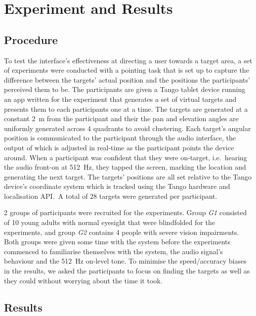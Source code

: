\documentclass{llncs}
\begin{document}
\section{Experiment and Results}\label{sec:experiment-and-results}

\subsection{Procedure}

To test the interface's effectiveness at directing a user towards a target area, a set of experiments were conducted with a pointing task that is set up to capture the difference between the targets' actual position and the positions the participants' perceived them to be.
The participants are given a Tango tablet device running an app written for the experiment that generates a set of virtual targets and presents them to each participants one at a time. 
The targets are generated at a constant \SI{2}{\meter} from the participant and their the pan and elevation angles are uniformly generated across 4 quadrants to avoid clustering.
Each target's angular position is communicated to the participant through the audio interface, the output of which is adjusted in real-time as the participant points the device around. 
When a participant was confident that they were on-target, i.e.\ hearing the audio front-on at \SI{512}{\hertz}, they tapped the screen, marking the location and generating the next target.
The targets' positions are all set relative to the Tango device's coordinate system which is tracked using the Tango hardware and localisation API.\
A total of 28 targets were generated per participant. 

2 groups of participants were recruited for the experiments. 
Group \textit{G1} consisted of 10 young adults with normal eyesight that were blindfolded for the experiments, and group \textit{G2} contains 4 people with severe vision impairments. 
Both groups were given some time with the system before the experiments commenced to familiarise themselves with the system, the audio signal's behaviour and the \SI{512}{\hertz} on-level tone. 
To minimise the speed/accuracy biases in the results, we asked the participants to focus on finding the targets as well as they could without worrying about the time it took.  

\subsection{Results}
\end{document}
